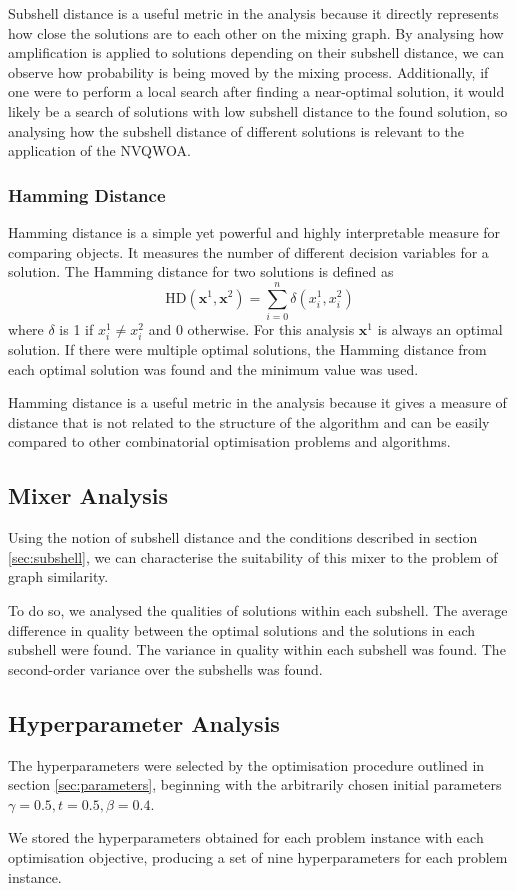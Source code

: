 Subshell distance is a useful metric in the analysis because it directly represents how close the solutions are to each other on the mixing graph. By analysing how amplification is applied to solutions depending on their subshell distance, we can observe how probability is being moved by the mixing process. Additionally, if one were to perform a local search after finding a near-optimal solution, it would likely be a search of solutions with low subshell distance to the found solution, so analysing how the subshell distance of different solutions is relevant to the application of the NVQWOA.

\subsubsection{Hamming Distance}
Hamming distance is a simple yet powerful and highly interpretable measure for comparing objects. It measures the number of different decision variables for a solution. The Hamming distance for two solutions is defined as 
$$\text{HD}(\mathbf{x}^1,\mathbf{x}^2)=\sum_{i=0}^n \delta(x^1_i,x^2_i)$$
where $\delta$ is 1 if $x^1_i\neq x^2_i$ and 0 otherwise. For this analysis $\mathbf{x}^1$ is always an optimal solution. If there were multiple optimal solutions, the Hamming distance from each optimal solution was found and the minimum value was used.

Hamming distance is a useful metric in the analysis because it gives a measure of distance that is not related to the structure of the algorithm and can be easily compared to other combinatorial optimisation problems and algorithms.

\subsection{Mixer Analysis}
Using the notion of subshell distance and the conditions described in section \ref{sec:subshell}, we can characterise the suitability of this mixer to the problem of graph similarity. 

To do so, we analysed the qualities of solutions within each subshell. The average difference in quality between the optimal solutions and the solutions in each subshell were found. The variance in quality within each subshell was found. The second-order variance over the subshells was found.



\subsection{Hyperparameter Analysis}
The hyperparameters were selected by the optimisation procedure outlined in section \ref{sec:parameters}, beginning with the arbitrarily chosen initial parameters $\gamma=0.5, t=0.5, \beta=0.4$.

We stored the hyperparameters obtained for each problem instance with each optimisation objective, producing a set of nine hyperparameters for each problem instance.